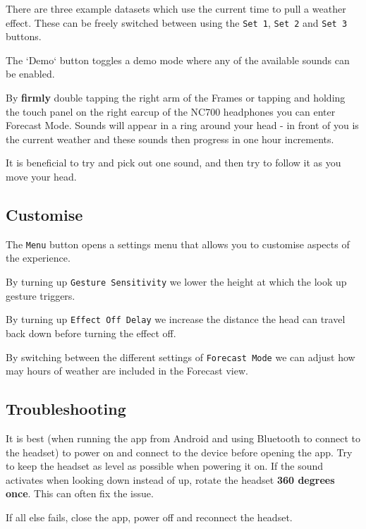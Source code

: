 \documentclass{l4proj}
\begin{document}
\begin{appendices}
There are three example datasets which use the current time to pull a weather effect. These can be freely switched between using the \texttt{Set 1}, \texttt{Set 2} and \texttt{Set 3} buttons.

The `Demo` button toggles a demo mode where any of the available sounds can be enabled.

By \textbf{firmly} double tapping the right arm of the Frames or tapping and holding the touch panel on the right earcup of the NC700 headphones you can enter Forecast Mode. Sounds will appear in a ring around your head - in front of you is the current weather and these sounds then progress in one hour increments.

It is beneficial to try and pick out one sound, and then try to follow it as you move your head.

\subsection{Customise}
The \texttt{Menu} button opens a settings menu that allows you to customise aspects of the experience.

By turning up \texttt{Gesture Sensitivity} we lower the height at which the look up gesture triggers.

By turning up \texttt{Effect Off Delay} we increase the distance the head can travel back down before turning the effect off.

By switching between the different settings of \texttt{Forecast Mode} we can adjust how may hours of weather are included in the Forecast view.

\subsection{Troubleshooting}
It is best (when running the app from Android and using Bluetooth to connect to the headset) to power on and connect to the device before opening the app. Try to keep the headset as level as possible when powering it on.
If the sound activates when looking down instead of up, rotate the headset \textbf{360 degrees once}. This can often fix the issue.

If all else fails, close the app, power off and reconnect the headset.

\end{appendices}





\renewcommand{\thechapter}{0} 

\end{document}
